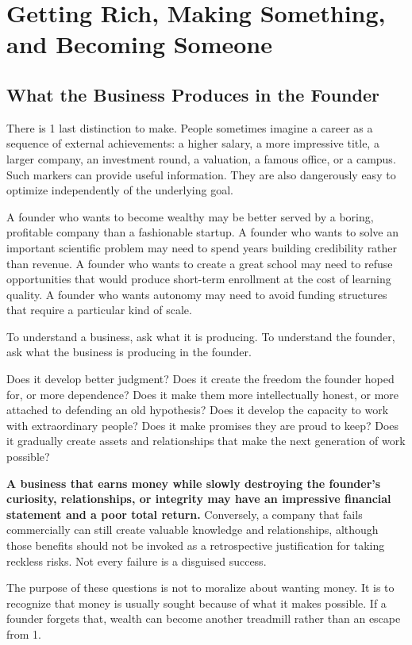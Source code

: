 \section{Getting Rich, Making Something, and Becoming Someone}

\subsection{What the Business Produces in the Founder}

There is 1 last distinction to make. People sometimes imagine a career as a sequence of external achievements: a higher salary, a more impressive title, a larger company, an investment round, a valuation, a famous office, or a campus. Such markers can provide useful information. They are also dangerously easy to optimize independently of the underlying goal.

A founder who wants to become wealthy may be better served by a boring, profitable company than a fashionable startup. A founder who wants to solve an important scientific problem may need to spend years building credibility rather than revenue. A founder who wants to create a great school may need to refuse opportunities that would produce short-term enrollment at the cost of learning quality. A founder who wants autonomy may need to avoid funding structures that require a particular kind of scale.

To understand a business, ask what it is producing. To understand the founder, ask what the business is producing in the founder.

Does it develop better judgment? Does it create the freedom the founder hoped for, or more dependence? Does it make them more intellectually honest, or more attached to defending an old hypothesis? Does it develop the capacity to work with extraordinary people? Does it make promises they are proud to keep? Does it gradually create assets and relationships that make the next generation of work possible?

\textbf{A business that earns money while slowly destroying the founder's curiosity, relationships, or integrity may have an impressive financial statement and a poor total return.} Conversely, a company that fails commercially can still create valuable knowledge and relationships, although those benefits should not be invoked as a retrospective justification for taking reckless risks. Not every failure is a disguised success.

The purpose of these questions is not to moralize about wanting money. It is to recognize that money is usually sought because of what it makes possible. If a founder forgets that, wealth can become another treadmill rather than an escape from 1.
